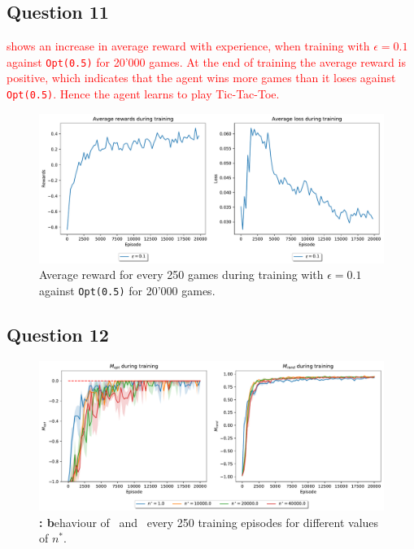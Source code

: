 \documentclass[10pt]{IEEEtran}
\begin{document}
\subsection*{Question 11}
\textcolor{red}{ shows an increase in average reward with experience, when training with $\epsilon = 0.1$ against \texttt{Opt(0.5)} for 20'000 games. At the end of training the average reward is positive, which indicates that the agent wins more games than it loses \textcolor{red}{against \texttt{Opt(0.5)}}. Hence the agent learns to play Tic-Tac-Toe.}

\begin{figure}[h]
    \centering
    \includegraphics[width = \linewidth]{code/figures/rewards_epsilon_exploration_Q11.pdf}
    \caption{Average reward for every 250 games during training with $\epsilon = 0.1$ against \texttt{Opt(0.5)} for 20'000 games.}
    \label{plot_question11}
\end{figure}

\subsection*{Question 12}
\begin{figure}[h]
    \centering
    \includegraphics[width = \linewidth]{code/figures/performance_dqn_n_star.pdf}
    \caption{\textbf{: b}ehaviour of \mopt\  and \mrand\  every 250 training episodes for different values of $n^{*}$.}
    \label{plot_question13}
\end{figure}
\end{document}
